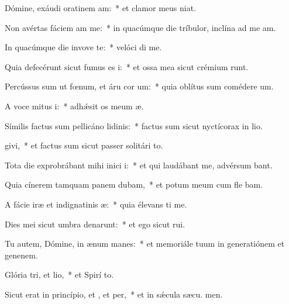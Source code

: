 \item Dómine, exáudi oratinem am:~* et clamor meus   niat.
\item Non avértas fáciem am  me:~* in quacúmque die tríbulor, inclína ad me  am.
\item In quacúmque die invove te:~* velóci di me.
\item Quia defecérunt sicut fumus es i:~* et ossa mea sicut crémium runt.
\item Percússus sum ut fœnum, et áru cor um:~* quia oblítus sum comédere  um.
\item A voce mitus i:~* adhǽsit os meum  æ.
\item Símilis factus sum pellicáno lidinis:~* factus sum sicut nyctícorax in lio.
\item {}givi,~* et factus sum sicut passer solitári  to.
\item Tota die exprobrábant mihi inici i:~* et qui laudábant me, advérsum  bant.
\item Quia cínerem tamquam panem dubam,~* et potum meum cum fle bam.
\item A fácie iræ et indignatinis æ:~* quia élevans ti me.
\item Dies mei sicut umbra denarunt:~* et ego sicut  rui.
\item Tu autem, Dómine, in ænum manes:~* et memoriále tuum in generatiónem et genenem.
\item Glória tri, et lio,~* et Spirí to.
\item Sicut erat in princípio, et , et per,~* et in sǽcula sæcu. men.
